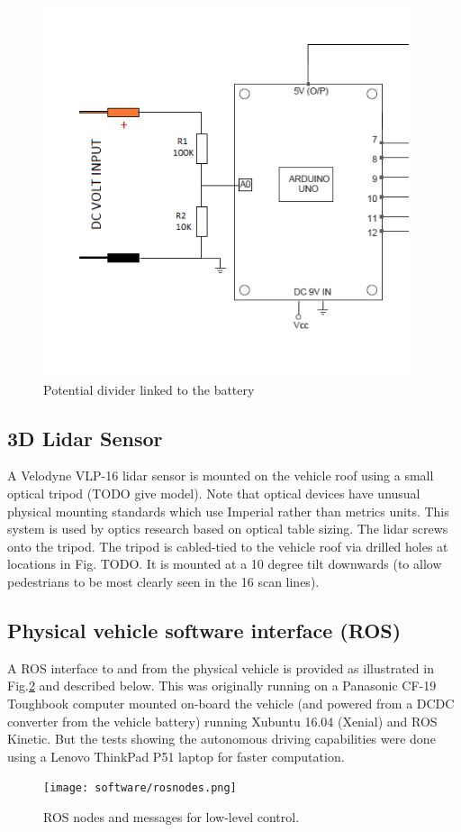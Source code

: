 \documentclass[a4paper]{article}
\begin{document}
\begin{figure}
	\includegraphics[width=0.5\columnwidth]{hardware/potential_divider.png}
	\caption{Potential divider linked to the battery}
	\label{fig:potential_divider}
\end{figure}


\subsection{3D Lidar Sensor}
A Velodyne VLP-16 lidar sensor is mounted on the vehicle roof using a small optical tripod (TODO give model). Note that optical devices have unusual physical mounting standards which use Imperial rather than metrics units.  This system is used by optics research based on optical table sizing. The lidar screws onto the tripod. The tripod is cabled-tied to the vehicle roof via  drilled holes at locations in Fig. TODO.  It is mounted at a 10 degree tilt downwards (to allow pedestrians to be most clearly seen in the 16 scan lines).

\subsection{Physical vehicle software interface (ROS)}

A ROS interface to and from the physical vehicle is provided as illustrated in Fig.\ref{fig:meshSim} and described below. This was originally running on a Panasonic CF-19 Toughbook computer mounted on-board the vehicle (and powered from a DCDC converter from the  vehicle battery) running Xubuntu 16.04 (Xenial) and ROS Kinetic. But the tests showing the autonomous driving capabilities were done using a Lenovo ThinkPad P51 laptop for faster computation.

\begin{figure}[h]
	\texttt{[image: software/rosnodes.png]}
	\caption{ROS nodes and messages for low-level control.}
	\label{fig:meshSim}
\end{figure}
\end{document}
